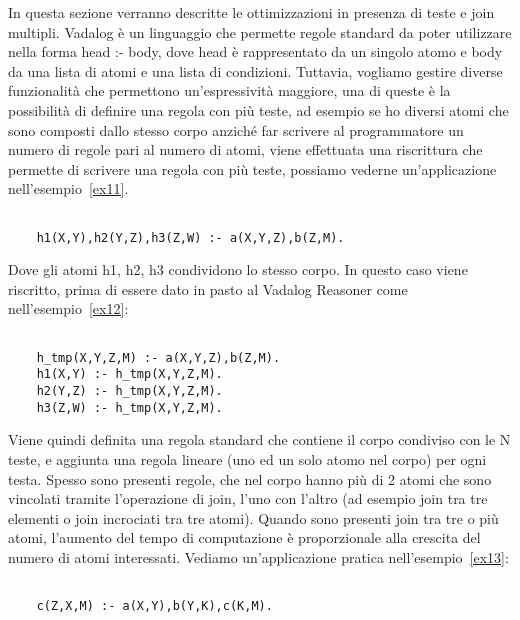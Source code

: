 In questa sezione verranno descritte le ottimizzazioni in presenza di teste e join multipli. \newline
Vadalog è un linguaggio che permette regole standard da poter utilizzare nella forma head :- body, dove head è rappresentato da un singolo atomo e body da una lista di atomi e una lista di condizioni. \newline
Tuttavia, vogliamo gestire diverse funzionalità che permettono un'espressività maggiore, una di queste è la possibilità di definire una regola con più teste, ad esempio se ho diversi atomi che sono composti dallo stesso corpo anziché far scrivere al programmatore un numero di regole pari al numero di atomi, viene effettuata una riscrittura che permette di scrivere una regola con più teste, possiamo vederne un'applicazione nell'esempio~\ref{ex11}. 
\begin{example}\label{ex11}
	\begin{lstlisting}
	
	h1(X,Y),h2(Y,Z),h3(Z,W) :- a(X,Y,Z),b(Z,M).
	\end{lstlisting}
\end{example}
Dove gli atomi h1, h2, h3 condividono lo stesso corpo. \newline
In questo caso viene riscritto, prima di essere dato in pasto al Vadalog Reasoner come nell'esempio~\ref{ex12}: 
\begin{example}\label{ex12}
	\begin{lstlisting}
	
	h_tmp(X,Y,Z,M) :- a(X,Y,Z),b(Z,M). 
	h1(X,Y) :- h_tmp(X,Y,Z,M). 
	h2(Y,Z) :- h_tmp(X,Y,Z,M). 
	h3(Z,W) :- h_tmp(X,Y,Z,M). 
	\end{lstlisting}
\end{example}
Viene quindi definita una regola standard che contiene il corpo condiviso con le N teste, e aggiunta una regola lineare (uno ed un solo atomo nel corpo) per ogni testa. \newline \newline
Spesso sono presenti regole, che nel corpo hanno più di 2 atomi che sono vincolati tramite l'operazione di join, l'uno con l'altro (ad esempio join tra tre elementi o join incrociati tra tre atomi). \newline
Quando sono presenti join tra tre o più atomi, l'aumento del tempo di computazione è proporzionale alla crescita del numero di atomi interessati. Vediamo un'applicazione pratica nell'esempio~\ref{ex13}:
\begin{example}\label{ex13}
	\begin{lstlisting}
	
	c(Z,X,M) :- a(X,Y),b(Y,K),c(K,M).
	\end{lstlisting}
\end{example}

